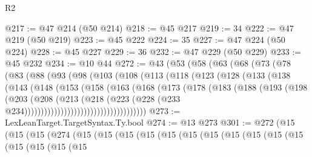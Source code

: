 \begin{lexlean}{R2}
\begin{coremodule}
@217 := @47 @214 (@50 @214)
@218 := @45 @217
@219 := 34
@222 := @47 @219 (@50 @219)
@223 := @45 @222
@224 := 35
@227 := @47 @224 (@50 @224)
@228 := @45 @227
@229 := 36
@232 := @47 @229 (@50 @229)
@233 := @45 @232
@234 := @10 @44
@272 := @43
    (@53
      (@58
        (@63
          (@68
            (@73
              (@78
                (@83
                  (@88
                    (@93
                      (@98
                        (@103
                          (@108
                            (@113
                              (@118
                                (@123
                                  (@128
                                    (@133
                                      (@138
                                        (@143
                                          (@148
                                            (@153
                                              (@158
                                                (@163
                                                  (@168
                                                    (@173
                                                      (@178
                                                        (@183
                                                          (@188
                                                            (@193
                                                              (@198
                                                                (@203
                                                                  (@208
                                                                    (@213
                                                                      (@218
                                                                        (@223
                                                                          (@228
                                                                            (@233
                                                                              @234)))))))))))))))))))))))))))))))))))))
@273 := LexLeanTarget.TargetSyntax.Ty.bool
@274 := @13 @273
@301 := @272
    (@15
      (@15
        (@15
          (@274
            (@15
              (@15
                (@15
                  (@15
                    (@15
                      (@15
                        (@15
                          (@15
                            (@15
                              (@15
                                (@15
                                  (@15
                                    (@15
                                      (@15
                                        (@15

\end{coremodule}
\end{lexlean}
